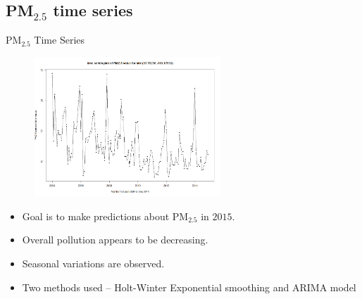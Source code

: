 \documentclass[notheorems,envcountsect,allowframebreaks,xcolor=svgnames,8pt]{beamer}
\begin{document}
\subsection{PM$_{2.5}$ time series}

\begin{frame}{PM$_{2.5}$ Time Series}
\begin{figure}
\centering
\includegraphics[width=70mm]{figs/ts1.png}
\end{figure}
\begin{itemize}
\item Goal is to make predictions about PM$_{2.5}$ in $2015$.
\item Overall pollution appears to be decreasing.
\item Seasonal variations are observed.
\item Two methods used -- Holt-Winter Exponential smoothing and ARIMA model 
\end{itemize}  
\end{frame}
\end{document}
